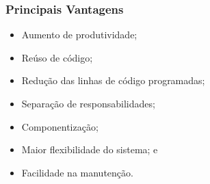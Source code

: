 \documentclass{beamer}
\begin{document}
\begin{frame}
	\frametitle{Principais Vantagens}
	
	\begin{itemize}
		\item Aumento de produtividade;
		\item Reúso de código;
		\item Redução das linhas de código programadas;
		\item Separação de responsabilidades;
		\item Componentização;
		\item Maior flexibilidade do sistema; e
		\item Facilidade na manutenção.
	\end{itemize}
\end{frame}
\end{document}
